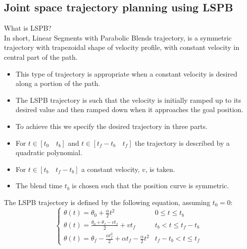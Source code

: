 \subsection{Joint space trajectory planning using LSPB}
What is LSPB?\\
In short, Linear Segments with Parabolic Blends trajectory, is a symmetric trajectory with
trapezoidal shape of velocity profile, with constant velocity in central part of the path.
\begin{itemize}
    \item This type of trajectory is appropriate when a constant velocity is
             desired along a portion of the path.
    \item The LSPB trajectory is such that the velocity is initially ramped up
             to its desired value and then ramped down when it approaches the
              goal position.
    \item To achieve this we specify the desired trajectory in three parts.
    \item For $t\in\left[t_0 \quad t_b\right]$ and $t\in\left[t_f-t_b \quad t_f\right]$ the trajectory is described by a quadratic polynomial.
    \item For $t\in\left[t_b \quad t_f - t_b\right]$ a constant velocity, $v$, is taken.
    \item The blend time $t_b$ is chosen such that the position curve is symmetric.
\end{itemize}
The LSPB trajectory is defined by the following equation, assuming $t_0=0$:
\begin{equation} \label{eq:lspb}
    \begin{cases}
        \theta(t) = \theta_0 + \frac{\alpha}{2} t^2 & 0 \leq t \leq t_b \\
        \theta(t) = \frac{\theta_0+\theta_f-vt_f}{2} + vt_f & t_b < t \leq t_f - t_b \\
        \theta(t) = \theta_f - \frac{\alpha t_f^2}{2} + \alpha t_f - \frac{\alpha}{2}t^2 & t_f - t_b < t \leq t_f
    \end{cases}
\end{equation}

